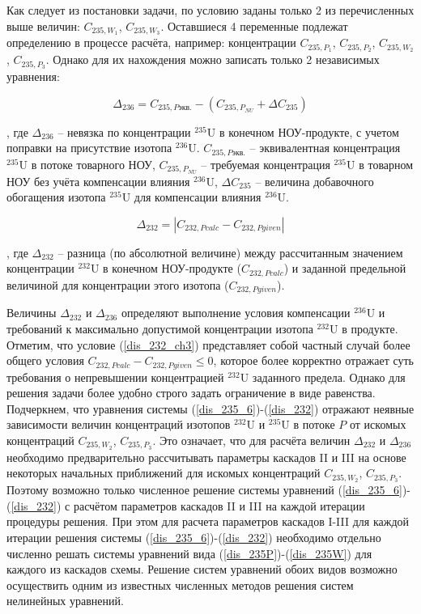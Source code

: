 Как следует из постановки задачи, по условию заданы только 2 из перечисленных выше величин: $C_{235,{W_1}}$, $C_{235,{W_3}}$. Оставшиеся 4 переменные подлежат определению в процессе расчёта, например: концентрации $C_{235,{P_1}}$, $C_{235,{P_2}}$, $C_{235,{W_2}}$, $C_{235,{P_3}}$. Однако для их нахождения можно записать только 2 независимых уравнения:  

\begin{equation}
    \label{dis_235_6}
    \Delta_{236}=C_{235,P\textit{экв.}}-(C_{235,{P_{NU}}}+\Delta C_{235})
\end{equation}

, где $\Delta_{236}$ -- невязка по концентрации $^{235}$U в конечном НОУ-продукте, с учетом поправки на присутствие изотопа $^{236}$U. $C_{235,P\textit{экв.}}$ -- эквивалентная концентрация $^{235}$U в потоке товарного НОУ, $C_{235,{P_{NU}}}$ -- требуемая концентрация $^{235}$U в товарном НОУ без учёта компенсации влияния $^{236}$U, $\Delta C_{235}$ -- величина добавочного обогащения изотопа $^{235}$U для компенсации влияния $^{236}$U. 

\begin{equation}
\label{dis_232}
\Delta_{232}=\left|C_{232,P\textit{calc}}-C_{232,P\textit{given}}\right|
\end{equation}

, где $\Delta_{232}$ -- разница (по абсолютной величине) между рассчитанным значением концентрации $^{232}$U в конечном НОУ-продукте ($C_{232,P\textit{calc}}$) и заданной предельной величиной для концентрации этого изотопа ($C_{232,P\textit{given}}$).

Величины $\Delta_{232}$ и $\Delta_{236}$ определяют выполнение условия компенсации $^{236}$U и требований к максимально допустимой концентрации изотопа $^{232}$U в продукте. Отметим, что условие (\ref{dis_232_ch3}) представляет собой частный случай более общего условия $C_{232,P\textit{calc}}-C_{232,P\textit{given}}\leq 0$, которое более корректно отражает суть требования о непревышении концентрацией $^{232}$U заданного предела. Однако для решения задачи более удобно строго задать ограничение в виде равенства. Подчеркнем, что уравнения системы (\ref{dis_235_6})-(\ref{dis_232}) отражают неявные зависимости величин концентраций изотопов $^{232}$U и $^{235}$U в потоке $P$ от искомых концентраций $C_{235,{W_2}}$, $C_{235,{P_3}}$. Это означает, что для расчёта величин $\Delta_{232}$ и $\Delta_{236}$ необходимо предварительно рассчитывать параметры каскадов II и III на основе некоторых начальных приближений для искомых концентраций $C_{235,{W_2}}$, $C_{235,{P_3}}$. Поэтому возможно только численное решение системы уравнений (\ref{dis_235_6})-(\ref{dis_232}) с расчётом параметров каскадов II и III на каждой итерации процедуры решения. При этом для расчета параметров каскадов I-III для каждой итерации решения системы (\ref{dis_235_6})-(\ref{dis_232}) необходимо отдельно численно решать системы уравнений вида (\ref{dis_235P})-(\ref{dis_235W}) для каждого из каскадов схемы. Решение систем уравнений обоих видов возможно осуществить одним из известных численных методов решения систем нелинейных уравнений. 

